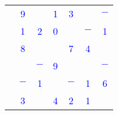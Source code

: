 \smallskip
\begin{center}
   {
   \begin{tabular}{|*{7}{C{0.57}|}}
      \hline
      &  &  &  &  &  &  \\
      \hline
       & \textcolor{blue}{9} &  & \textcolor{blue}{1} & \textcolor{blue}{3} &  & \textcolor{blue}{$-$} \\
      \hline
       & \textcolor{blue}{1} & \textcolor{blue}{2} & \textcolor{blue}{0} &  & \textcolor{blue}{$-$} & \textcolor{blue}{1} \\
      \hline
       & \textcolor{blue}{8} &  &  & \textcolor{blue}{7} & \textcolor{blue}{4} &  \\
      \hline
       &  & \textcolor{blue}{$-$} & \textcolor{blue}{9} &  &  & \textcolor{blue}{$-$} \\
      \hline
       & \textcolor{blue}{$-$} & \textcolor{blue}{1} &  & \textcolor{blue}{$-$} & \textcolor{blue}{1} & \textcolor{blue}{6} \\
      \hline
       & \textcolor{blue}{3} &  & \textcolor{blue}{4} & \textcolor{blue}{2} & \textcolor{blue}{1} &  \\
      \hline
   \end{tabular}}
   \end{center}
